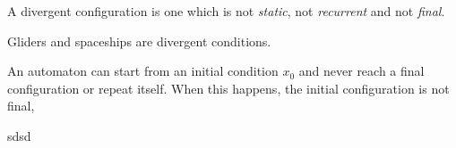 \begin{proposition}
A divergent configuration is one which is not \textit{static}, not \textit{recurrent} and not
\textit{final}.
\end{proposition}

Gliders and spaceships are divergent conditions.

\begin{proposition}
An automaton can start from an initial condition $x_0$ and never reach a final configuration or
repeat itself. When this happens, the initial configuration is not final, 
\end{proposition}

sdsd
